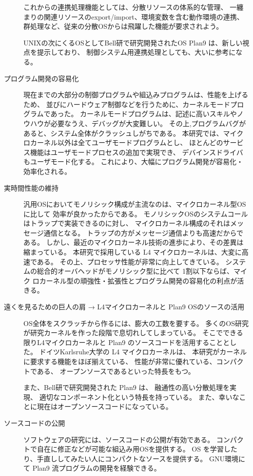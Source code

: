 \begin{description}
      これからの連携処理機能としては、分散リソースの体系的な管理、
      一纏まりの関連リソースのexport/import、環境変数を含む動作環境の連携、
      群処理など、従来の分散OSからは飛躍した機能が要求されよう。

      UNIXの次にくるOSとしてBell研で研究開発されたOS Plan9 は、新しい視点を提示しており、
      制御システム用連携処理としても、大いに参考になる。


\item[プログラム開発の容易化]
      現在までの大部分の制御プログラムや組込みプログラムは、性能を上げるため、
      並びにハードウェア制御などを行うために、カーネルモードプログラムであった。
      カーネルモードプログラムは、記述に高いスキルやノウハウが必要なうえ、デバッグが大変難しい。
    その上,プログラムバグがあると、システム全体がクラッシュしがちである。
      本研究では、マイクロカーネル以外は全てユーザモードプログラムとし、
      ほとんどのサービス機能はユーザモードプロセスの追加で実現でき、
      デバインスドライバもユーザモード化する。
    これにより、大幅にプログラム開発が容易化・効率化される。
    
\item[実時間性能の維持]
      汎用OSにおいてモノリシック構成が主流なのは、マイクロカーネル型OSに比して
      効率が良かったからである。
      モノリシックOSのシステムコールはトラップで実装できるのに対し、
      マイクロカーネル構成のそれはメッセージ通信となる。
      トラップの方がメッセージ通信よりも高速だからである。
      しかし、最近のマイクロカーネル技術の進歩により、その差異は縮まっている。
      本研究で採用している L4 マイクロカーネルは、大変に高速である。
      その上、プロセッサ性能が非常に向上してきている。
      システムの総合的オーバヘッドがモノリシック型に比べて 1割以下ならば、マイク
    ロカーネル型の頑強性・拡張性とプログラム開発の容易化の利点が活きる。
    

\item[遠くを見るための巨人の肩   → L4マイクロカーネルと Plan9 OSのソースの活用]  
      OS全体をスクラッチから作るには、膨大の工数を要する。
多くのOS研究が研究カーネルを作った段階で息切れしてしまっている。
そこでできる限りL4マイクロカーネルと Plan9 のソースコードを活用することとした。
ドイツKarlsruhe大学の L4 マイクロカーネルは、
          本研究がカーネルに要求する機能をほぼ揃えている、
          性能が非常に優れている、コンパクトである、 
          オープンソースであるといった特長をもつ。

    また、Bell研で研究開発された Plan9 は、
    融通性の高い分散処理を実現、
    適切なコンポーネント化という特長を持っている。
    また、幸いなことに現在はオープンソースコードになっている。
    
\item[ソースコードの公開]
      ソフトウェアの研究には、ソースコードの公開が有効である。
      コンパクトで自在に修正などが可能な組込み用OSを提供する。
      OS を学習したり、手直ししてみたい人にコンパクトなソースを提供する。
      GNU環境にて Plan9 流プログラムの開発を経験できる。
\end{description}


